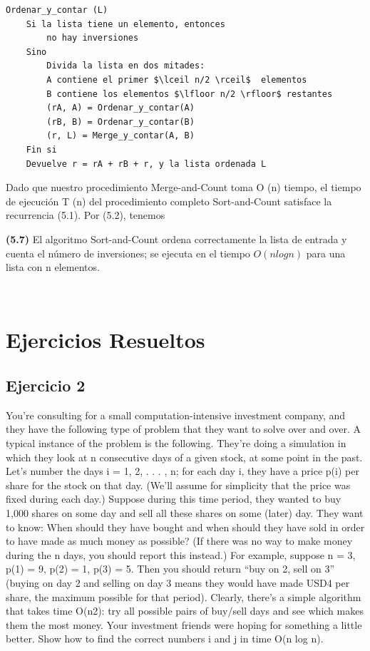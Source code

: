 \documentclass[a4paper, 12pt]{book}
\theoremstyle{dotless}
\begin{document}
\begin{lstlisting}
Ordenar_y_contar (L)
    Si la lista tiene un elemento, entonces
        no hay inversiones
    Sino
        Divida la lista en dos mitades:
        A contiene el primer $\lceil n/2 \rceil$  elementos
        B contiene los elementos $\lfloor n/2 \rfloor$ restantes
        (rA, A) = Ordenar_y_contar(A)
        (rB, B) = Ordenar_y_contar(B)
        (r, L) = Merge_y_contar(A, B)
    Fin si
    Devuelve r = rA + rB + r, y la lista ordenada L
\end{lstlisting}

Dado que nuestro procedimiento Merge-and-Count toma O (n) tiempo, el tiempo de ejecución T (n) del procedimiento completo Sort-and-Count satisface la recurrencia (5.1). Por (5.2), tenemos\\


\colorbox{mygray}{\parbox{15cm}{
\textbf{(5.7)} El algoritmo Sort-and-Count ordena correctamente la lista de entrada y cuenta el número de inversiones; se ejecuta en el tiempo $O (n log n)$ para una lista con n elementos.}}\\

\section*{Ejercicios Resueltos}

\subsection*{Ejercicio 2}

You’re consulting for a small computation-intensive investment company, and
they have the following type of problem that they want to solve over and over.
A typical instance of the problem is the following. They’re doing a simulation
in which they look at n consecutive days of a given stock, at some point in
the past. Let’s number the days i = 1, 2, . . . , n; for each day i, they have a
price p(i) per share for the stock on that day. (We’ll assume for simplicity that
the price was fixed during each day.) Suppose during this time period, they
wanted to buy 1,000 shares on some day and sell all these shares on some
(later) day. They want to know: When should they have bought and when
should they have sold in order to have made as much money as possible? (If
there was no way to make money during the n days, you should report this
instead.)
For example, suppose n = 3, p(1) = 9, p(2) = 1, p(3) = 5. Then you should
return “buy on 2, sell on 3” (buying on day 2 and selling on day 3 means they
would have made USD4 per share, the maximum possible for that period).
Clearly, there’s a simple algorithm that takes time O(n2): try all possible
pairs of buy/sell days and see which makes them the most money. Your
investment friends were hoping for something a little better.
Show how to find the correct numbers i and j in time O(n log n).
\end{document}
